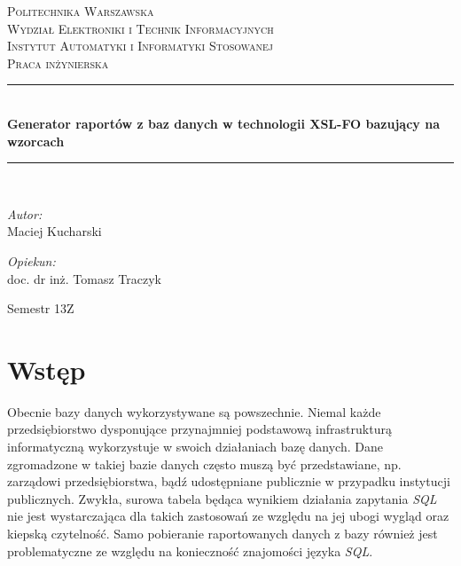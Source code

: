 \documentclass[11pt,a4paper]{article}
\newcommand{\HRule}{\rule{\linewidth}{0.5mm}}
\begin{document}
\begin{titlepage}
\begin{center}
\textsc{\LARGE Politechnika Warszawska}\\[0.5cm]
\textsc{\Large Wydział Elektroniki i Technik Informacyjnych}\\
\textsc{\Large Instytut Automatyki i Informatyki Stosowanej}\\[1.5cm]

\textsc{\Large Praca inżynierska} \\[0.5cm]
\HRule \\[0.4cm]
{ \huge \bfseries Generator raportów z baz danych w technologii XSL-FO  bazujący na wzorcach \\[0.4cm]}
\HRule \\[1.5cm]

\begin{minipage} {0.4\textwidth}
\begin{flushleft} \large
\emph{Autor:}\\
 Maciej Kucharski 
\end{flushleft}
\end{minipage}
\begin{minipage} {0.4\textwidth}
\begin{flushright} \large

\emph{Opiekun:}\\
doc. dr inż. Tomasz Traczyk

\end{flushright}
\end{minipage}	
\vfill
\large Semestr 13Z

	\end{center}
\end{titlepage}
 
\tableofcontents
\newpage

\section{Wstęp} \label{sec:wst}
Obecnie bazy danych wykorzystywane są powszechnie. Niemal każde przedsiębiorstwo dysponujące przynajmniej podstawową infrastrukturą informatyczną wykorzystuje w swoich działaniach bazę danych. Dane zgromadzone w takiej bazie danych często muszą być przedstawiane, np. zarządowi przedsiębiorstwa, bądź udostępniane publicznie w przypadku instytucji publicznych. Zwykła, surowa tabela będąca wynikiem działania zapytania \emph{SQL} nie jest wystarczająca dla takich zastosowań ze względu na jej ubogi wygląd oraz kiepską czytelność.  Samo pobieranie raportowanych danych z bazy również jest problematyczne ze względu na konieczność znajomości języka \emph{SQL}. 
\end{document}
